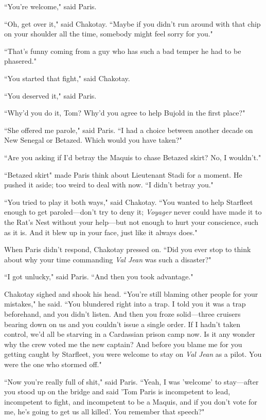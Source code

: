 \documentclass[twoside,letterpaper,12pt]{memoir}
\begin{document}
``You're welcome," said Paris.

``Oh, get over it," said Chakotay. ``Maybe if you didn't run around with that chip on your shoulder all the time, somebody might feel sorry for you."

``That's funny coming from a guy who has such a bad temper he had to be phasered."

``You started that fight," said Chakotay.

``You deserved it," said Paris.

``Why'd you do it, Tom? Why'd you agree to help Bujold in the first place?"

``She offered me parole," said Paris. ``I had a choice between another decade on New Senegal or Betazed. Which would you have taken?"

``Are you asking if I'd betray the Maquis to chase Betazed skirt? No, I wouldn't."

``Betazed skirt" made Paris think about Lieutenant Stadi for a moment. He pushed it aside; too weird to deal with now. ``I didn't betray you."

``You tried to play it both ways," said Chakotay. ``You wanted to help Starfleet enough to get paroled---don't try to deny it; \textit{Voyager} never could have made it to the Rat's Nest without your help---but not enough to hurt your conscience, such as it is. And it blew up in your face, just like it always does."

When Paris didn't respond, Chakotay pressed on. ``Did you ever stop to think about why your time commanding \textit{Val Jean} was such a disaster?"

``I got unlucky," said Paris. ``And then you took advantage."

Chakotay sighed and shook his head. ``You're still blaming other people for your mistakes," he said. ``You blundered right into a trap. I told you it was a trap beforehand, and you didn't listen. And then you froze solid---three cruisers bearing down on us and you couldn't issue a single order. If I hadn't taken control, we'd all be starving in a Cardassian prison camp now. Is it any wonder why the crew voted me the new captain? And before you blame me for you getting caught by Starfleet, you were welcome to stay on \textit{Val Jean} as a pilot. You were the one who stormed off."

``Now you're really full of shit," said Paris. ``Yeah, I was 'welcome' to stay---after you stood up on the bridge and said 'Tom Paris is incompetent to lead, incompetent to fight, and incompetent to be a Maquis, and if you don't vote for me, he's going to get us all killed'. You remember that speech?"
\end{document}
